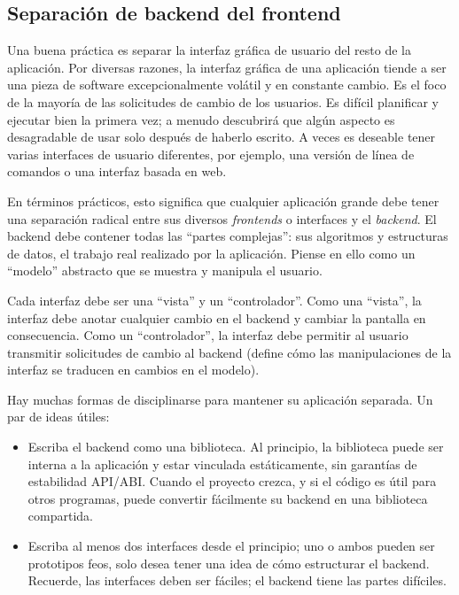 \subsection{Separación de backend del frontend}
\label{intro-backend-frontend-separation}
Una buena práctica es separar la interfaz gráfica de usuario del resto de la aplicación. Por diversas razones, la interfaz gráfica de una aplicación tiende a ser una pieza de software excepcionalmente volátil y en constante cambio. Es el foco de la mayoría de las solicitudes de cambio de los usuarios. Es difícil planificar y ejecutar bien la primera vez; a menudo descubrirá que algún aspecto es desagradable de usar solo después de haberlo escrito. A veces es deseable tener varias interfaces de usuario diferentes, por ejemplo, una versión de línea de comandos o una interfaz basada en web.

En términos prácticos, esto significa que cualquier aplicación grande debe tener una separación radical entre sus diversos \emph{frontends} o interfaces y el \emph{backend}. El backend debe contener todas las ``partes complejas'': sus algoritmos y estructuras de datos, el trabajo real realizado por la aplicación. Piense en ello como un ``modelo'' abstracto que se muestra y manipula el usuario.

Cada interfaz debe ser una ``vista'' y un ``controlador''. Como una ``vista'', la interfaz debe anotar cualquier cambio en el backend y cambiar la pantalla en consecuencia. Como un ``controlador'', la interfaz debe permitir al usuario transmitir solicitudes de cambio al backend (define cómo las manipulaciones de la interfaz se traducen en cambios en el modelo).

Hay muchas formas de disciplinarse para mantener su aplicación separada. Un par de ideas útiles:

\begin{itemize}
    \item Escriba el backend como una biblioteca. Al principio, la biblioteca puede ser interna a la aplicación y estar vinculada estáticamente, sin garantías de estabilidad API/ABI. Cuando el proyecto crezca, y si el código es útil para otros programas, puede convertir fácilmente su backend en una biblioteca compartida.
    \item Escriba al menos dos interfaces desde el principio; uno o ambos pueden ser prototipos feos, solo desea tener una idea de cómo estructurar el backend. Recuerde, las interfaces deben ser fáciles; el backend tiene las partes difíciles.
\end{itemize}

